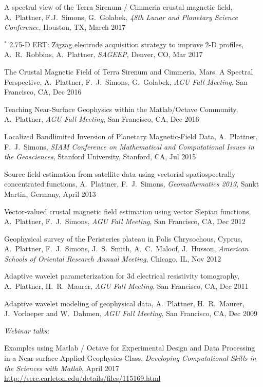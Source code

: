 \documentclass[10pt]{article}
\begin{document}
\spcp
A spectral view of the Terra Sirenum / Cimmeria crustal magnetic field, A.~Plattner, F.J.~Simons, G.~Golabek, \emph{48th Lunar and Planetary Science Conference}, Houston, TX, March 2017

\spcp 
\hspace{-0.4cm} $^*$ 2.75-D ERT: Zigzag electrode acquisition strategy
to improve 2-D profiles,
A.~R.~Robbins, A.~Plattner,
\emph{SAGEEP}, Denver, CO, Mar 2017

\spcp
The Crustal Magnetic Field of Terra Sirenum and Cimmeria, Mars. A Spectral Perspective,
A.~Plattner, F.~J.~Simons, G.~Golabek, 
\emph{AGU Fall Meeting}, San Francisco, CA, Dec 2016

\spcp
Teaching Near-Surface Geophysics within the Matlab/Octave Community,
A.~Plattner, 
\emph{AGU Fall Meeting}, San Francisco, CA, Dec 2016

\spcp
Localized Bandlimited Inversion of Planetary Magnetic-Field Data,
A.~Plattner, F.~J.~Simons,
\emph{SIAM Conference on Mathematical and Computational Issues in the Geosciences},
Stanford University, Stanford, CA, Jul 2015

\spcp
Source field estimation from satellite data using vectorial spatiospectrally 
concentrated functions,
A.~Plattner, F.~J.~Simons,
\emph{Geomathematics 2013}, Sankt Martin, Germany, April 2013

\spcp
Vector-valued crustal magnetic field estimation using vector Slepian functions,
A.~Plattner, F.~J.~Simons,
\emph{AGU Fall Meeting}, San Francisco, CA, Dec 2012

\spcp
Geophysical survey of the Peristeries plateau in Polis Chrysochous, Cyprus,
A.~Plattner, F.~J.~Simons, J.~S.~Smith, A.~C.~Maloof, J.~Husson,
\emph{American Schools of Oriental Research Annual Meeting}, Chicago, IL, Nov 2012

\spcp
Adaptive wavelet parameterization for 3d electrical resistivity tomography,
A.~Plattner, H.~R.~Maurer, 
\emph{AGU Fall Meeting}, San Francisco, CA, Dec 2011

\spcp
Adaptive wavelet modeling of geophysical data,
A.~Plattner, H.~R.~Maurer, J.~Vorloeper and W.~Dahmen, 
\emph{AGU Fall Meeting}, San Francisco, CA, Dec 2009


\spc
\emph{Webinar talks:}

\spcp
Examples using Matlab / Octave for Experimental Design and Data Processing in a Near-surface Applied Geophysics Class, 
\emph{Developing Computational Skills in the Sciences with Matlab}, April 2017\\
\url{http://serc.carleton.edu/details/files/115169.html}
\end{document}
